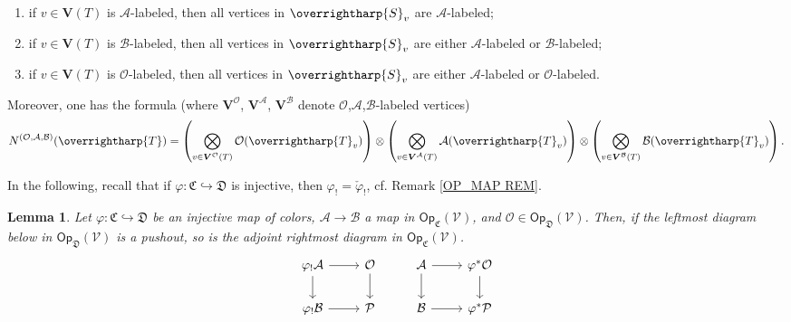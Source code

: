 \documentclass[a4paper,10pt
,draft
]{article}%
\numberwithin{equation}{section}
\numberwithin{figure}{section}
\newtheorem{lemma}[equation]{Lemma}%
\theoremstyle{definition} %
\newcommand{\vect}[1]{\text{\overrightharp{\ensuremath{#1}}}}
\newcommand{\V}{\ensuremath{\mathcal V}}
\newcommand{\1}{\ensuremath{\mathbbm 1}}%
\begin{document}
\begin{enumerate}[label=(\roman*)]
	\item if $v \in \boldsymbol{V}(T)$ is $\mathcal{A}$-labeled,
	then all vertices in $\vect{S}_{v}$ are $\mathcal{A}$-labeled;
	\item if $v \in \boldsymbol{V}(T)$ is $\mathcal{B}$-labeled,
	then all vertices in $\vect{S}_{v}$ are either $\mathcal{A}$-labeled or $\mathcal{B}$-labeled;
	\item if $v \in \boldsymbol{V}(T)$ is $\mathcal{O}$-labeled, then all vertices in $\vect{S}_{v}$ are either $\mathcal{A}$-labeled or $\mathcal{O}$-labeled.
\end{enumerate}
Moreover, one has the formula
(where $\boldsymbol{V}^{\mathcal{O}}$,
$\boldsymbol{V}^{\mathcal{A}}$,
$\boldsymbol{V}^{\mathcal{B}}$
denote
$\mathcal{O}$,$\mathcal{A}$,$\mathcal{B}$-labeled vertices)
\begin{equation}\label{NBAO EQ}
N^{(\mathcal{O},\mathcal{A},\mathcal{B})}(\vect{T}) = 
\left(\bigotimes_{v \in \boldsymbol{V}^{\mathcal{O}}(T)} \mathcal{O}(\vect{T}_v) \right)
\otimes
\left(\bigotimes_{v \in \boldsymbol{V}^{\mathcal{A}}(T)} \mathcal{A}(\vect{T}_v) \right)
\otimes
\left(\bigotimes_{v \in \boldsymbol{V}^{\mathcal{B}}(T)} \mathcal{B}(\vect{T}_v) \right).
\end{equation}


In the following, recall that if 
$\varphi \colon \mathfrak{C} \hookrightarrow \mathfrak{D}$
is injective, then
$\varphi_! = \check{\varphi}_!$,
cf. Remark \ref{OP_MAP REM}.



\begin{lemma}\label{BASICPUSH LEMMA}
	Let $\varphi \colon \mathfrak{C} \hookrightarrow \mathfrak{D}$ be an injective map of colors, 
	$\mathcal{A} \to \mathcal{B}$ a map in 
	$\mathsf{Op}_{\mathfrak{C}}(\V)$,
	and
	$\mathcal{O} \in \mathsf{Op}_{\mathfrak{D}}(\V)$.
	Then, if the leftmost diagram below in 
	$\mathsf{Op}_{\mathfrak{D}}(\V)$ is a pushout,
	so is the adjoint rightmost diagram in $\mathsf{Op}_{\mathfrak{C}}(\V)$.
	\[
	\begin{tikzcd}
	\varphi_! \mathcal{A} \ar{r} \ar{d} & \mathcal{O} \ar{d}
	&
	\mathcal{A} \ar{r} \ar{d} & \varphi^{\**} \mathcal{O} \ar{d}
	\\
	\varphi_! \mathcal{B} \ar{r} & \mathcal{P}
	&
	\mathcal{B} \ar{r} & \varphi^{\**} \mathcal{P}
	\end{tikzcd}
	\]
\end{lemma}
\end{document}
